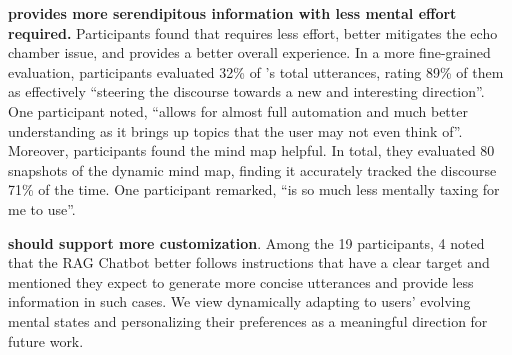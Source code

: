 \noindent
\textbf{\system provides more serendipitous information with less mental effort required.}\quad
Participants found that \system requires less effort, better mitigates the echo chamber issue, and provides a better overall experience. In a more fine-grained evaluation, participants evaluated 32\% of \system’s total utterances, rating 89\%
of them as effectively ``steering the discourse towards a new and interesting direction''. %
One participant noted, ``\system allows for almost full automation and much better understanding as it brings up topics that the user may not even think of''. Moreover, participants found the mind map helpful. %
In total, they evaluated 80 snapshots of the dynamic mind map, %
finding it accurately tracked the discourse 71\%
of the time. One participant remarked, ``\system is so much less mentally taxing for me to use''.



\noindent
\textbf{\system should support more customization}.\quad
Among the 19 participants, 4 noted that the RAG Chatbot better follows instructions that have a clear target and mentioned they expect \system to generate more concise utterances and provide less information in such cases. 
We view dynamically adapting \system to users’ evolving mental states and personalizing their preferences as a meaningful direction for future work.

